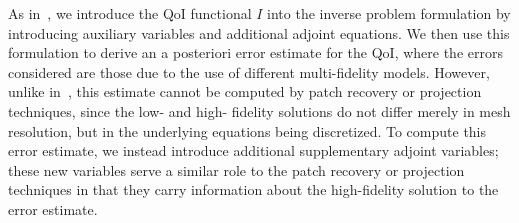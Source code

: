 \documentclass[review,sort&compress]{elsarticle}
\theoremstyle{plain} %
\theoremstyle{definition} %
\begin{document}
As in~\cite{BecVex05}, we introduce the QoI functional $I$ into the inverse problem formulation by introducing auxiliary variables and additional adjoint equations. We then use this formulation to derive an a posteriori error estimate for the QoI, where the errors considered are those due to the use of different multi-fidelity models. However, unlike in~\cite{BecVex05}, this estimate cannot be computed by patch recovery or projection techniques, since the low- and high- fidelity solutions do not differ merely in mesh resolution, but in the underlying equations being discretized. To compute this error estimate, we instead introduce additional supplementary adjoint variables; these new variables serve a similar role to the patch recovery or projection techniques in that they carry information about the high-fidelity solution to the error estimate.

%
\end{document}
